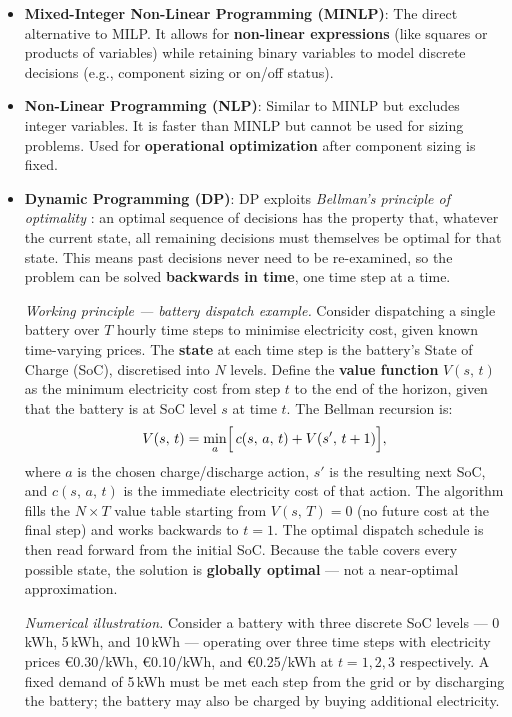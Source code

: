\documentclass[11pt,a4paper]{report}
\begin{document}
\begin{itemize}
    \item \textbf{Mixed-Integer Non-Linear Programming (MINLP)}: The direct alternative to MILP. It allows for \textbf{non-linear expressions} (like squares or products of variables) while retaining binary variables to model discrete decisions (e.g., component sizing or on/off status). 
    \item \textbf{Non-Linear Programming (NLP)}: Similar to MINLP but excludes integer variables. It is faster than MINLP but cannot be used for sizing problems. Used for \textbf{operational optimization} after component sizing is fixed.
    \item \textbf{Dynamic Programming (DP)}: DP exploits \textit{Bellman's principle of optimality} \cite{bellman1957dynamic}: an optimal sequence of decisions has the property that, whatever the current state, all remaining decisions must themselves be optimal for that state.
    This means past decisions never need to be re-examined, so the problem can be solved \textbf{backwards in time}, one time step at a time.

    \textit{Working principle --- battery dispatch example.}
    Consider dispatching a single battery over $T$ hourly time steps to minimise electricity cost, given known time-varying prices.
    The \textbf{state} at each time step is the battery's State of Charge (SoC), discretised into $N$ levels.
    Define the \textbf{value function} $V(s,\,t)$ as the minimum electricity cost from step $t$ to the end of the horizon, given that the battery is at SoC level $s$ at time $t$.
    The Bellman recursion is:
    \begin{equation}
        V(s,\,t) = \min_{a}\Bigl[\,c(s,\,a,\,t) + V(s',\,t+1)\Bigr],
        \label{eq:bellman}
    \end{equation}
    where $a$ is the chosen charge/discharge action, $s'$ is the resulting next SoC, and $c(s,\,a,\,t)$ is the immediate electricity cost of that action.
    The algorithm fills the $N \times T$ value table starting from $V(s,\,T)=0$ (no future cost at the final step) and works backwards to $t=1$.
    The optimal dispatch schedule is then read forward from the initial SoC.
    Because the table covers every possible state, the solution is \textbf{globally optimal} --- not a near-optimal approximation.

    \textit{Numerical illustration.}
    Consider a battery with three discrete SoC levels --- 0\,kWh, 5\,kWh, and 10\,kWh --- operating over three time steps with electricity prices \mbox{\euro0.30/kWh}, \mbox{\euro0.10/kWh}, and \mbox{\euro0.25/kWh} at $t=1,2,3$ respectively.
    A fixed demand of 5\,kWh must be met each step from the grid or by discharging the battery; the battery may also be charged by buying additional electricity.


\end{itemize}
\end{document}
